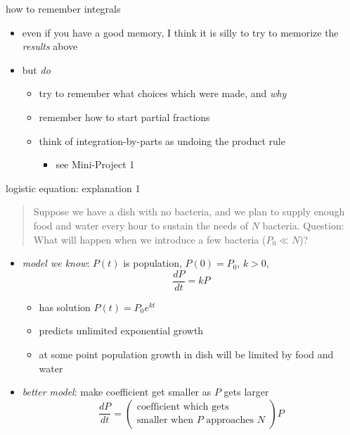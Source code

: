 \documentclass{beamer}
\begin{document}
\begin{frame}{how to remember integrals}

\begin{itemize}
\item even if you have a good memory, I think it is silly to try to memorize the \emph{results} above
\item but \emph{do}
    \begin{itemize}
    \item try to remember what choices which were made, and \emph{why}
    \item remember how to start partial fractions
    \item think of integration-by-parts as undoing the product rule
        \begin{itemize}
        \item see Mini-Project 1
        \end{itemize}
    \end{itemize}
\end{itemize}
\end{frame}


\begin{frame}{logistic equation: explanation 1}

\small
\begin{quotation}
\noindent Suppose we have a dish with no bacteria, and we plan to supply enough food and water every hour to sustain the needs of $N$ bacteria.  Question: What will happen when we introduce a few bacteria ($P_0 \ll N$)?
\end{quotation}

\normalsize
\begin{itemize}
\item \emph{model we know}:  $P(t)$ is population, $P(0)=P_0$, $k>0$,
    $$\frac{dP}{dt} = k P$$

\vspace{-2mm}
    \begin{itemize}
    \item has solution $P(t) = P_0 e^{kt}$
    \item predicts unlimited exponential growth
    \item at some point population growth in dish will be limited by food and water
    \end{itemize}
\item \emph{better model}: make coefficient get smaller as $P$ gets larger
    $$\frac{dP}{dt} = \left(\begin{matrix} \text{coefficient which gets} \\ \text{smaller when $P$ approaches $N$}\end{matrix} \right) P$$
\end{itemize}
\end{frame}
\end{document}
